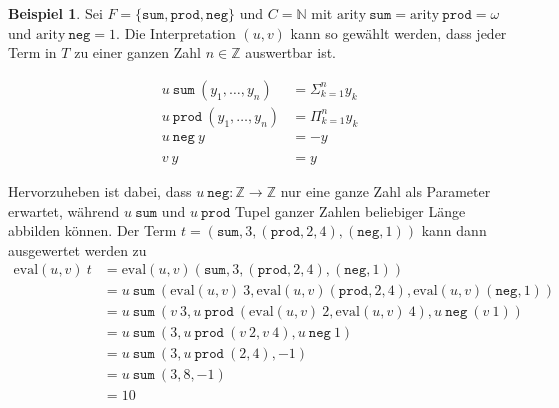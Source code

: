 \documentclass{scrartcl}
\numberwithin{figure}{section} %
\theoremstyle{definition} %
\newcommand{\elems}[3]{{#1}_{#2}, \dots, {#1}_{#3}}
\begin{document}
\newtheorem{bEval}[bsp]{Beispiel}
\begin{bEval} \label{bEval}
Sei $F = \{\texttt{sum}, \texttt{prod}, \texttt{neg} \}$ und $C = \mathbb{N}$ mit $\mathrm{arity}~ \texttt{sum} = \mathrm{arity}~ \texttt{prod} = \omega$ und $\mathrm{arity}~ \texttt{neg} = 1$.
Die Interpretation $(u, v)$ kann so gewählt werden, dass jeder Term in $T$ zu einer ganzen Zahl $n \in \mathbb{Z}$ auswertbar ist.

\begin{equation*}
    \begin{split}
    u~\texttt{sum}  ~(\elems y 1 n) &= \Sigma_{k = 1}^n y_k\\
    u~\texttt{prod} ~(\elems y 1 n) &=    \Pi_{k = 1}^n y_k\\
    u~\texttt{neg}~y &= -y\\
    &\\
    v~y &= y
    \end{split}
\end{equation*}

Hervorzuheben ist dabei, dass $u~\texttt{neg} \colon \mathbb Z \rightarrow \mathbb Z$ nur eine ganze Zahl als Parameter erwartet, während $u~\texttt{sum}$ und $u~\texttt{prod}$ Tupel ganzer Zahlen beliebiger Länge abbilden können.
Der Term $t = (\texttt{sum}, 3, (\texttt{prod}, 2, 4), (\texttt{neg}, 1))$ kann dann ausgewertet werden zu 
\begin{equation*}
    \begin{split}
    \mathrm{eval}(u, v)~t &= \mathrm{eval}(u, v) (\texttt{sum}, 3, (\texttt{prod}, 2, 4), (\texttt{neg}, 1)) \\
    &= u~\texttt{sum}~(\mathrm{eval}(u, v)~3, \mathrm{eval}(u, v)(\texttt{prod}, 2, 4),  \mathrm{eval}(u, v) (\texttt{neg}, 1)) \\
    &= u~\texttt{sum}~(v~3, u~\texttt{prod}~(\mathrm{eval}(u, v)~2, \mathrm{eval}(u, v)~4), u~\texttt{neg}~ (v~1)) \\
    &= u~\texttt{sum}~(3, u~\texttt{prod}~(v~2, v~4), u~\texttt{neg}~ 1) \\
    &= u~\texttt{sum}~(3, u~\texttt{prod}~(2, 4), -1) \\
    &= u~\texttt{sum}~( 3, 8, -1) \\
    &= 10 \\
    \end{split}
\end{equation*}
\end{bEval}
\end{document}
